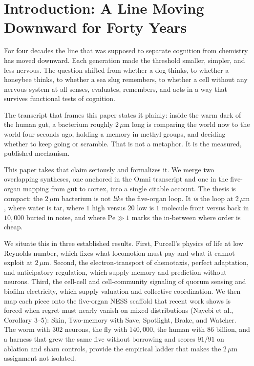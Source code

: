 \documentclass[12pt,a4paper]{article}
\newcommand{\Pe}{\mathrm{Pe}}
\begin{document}
\tableofcontents
\newpage

\section{Introduction: A Line Moving Downward for Forty Years}
\label{sec:intro}

For four decades the line that was supposed to separate cognition from chemistry has moved downward. Each generation made the threshold smaller, simpler, and less nervous. The question shifted from whether a dog thinks, to whether a honeybee thinks, to whether a sea slug remembers, to whether a cell without any nervous system at all senses, evaluates, remembers, and acts in a way that survives functional tests of cognition.

The transcript that frames this paper states it plainly: inside the warm dark of the human gut, a bacterium roughly $2\,\mu\mathrm{m}$ long is comparing the world now to the world four seconds ago, holding a memory in methyl groups, and deciding whether to keep going or scramble. That is not a metaphor. It is the measured, published mechanism.

This paper takes that claim seriously and formalizes it. We merge two overlapping syntheses, one anchored in the Omni transcript and one in the five-organ mapping from gut to cortex, into a single citable account. The thesis is compact: the $2\,\mu\mathrm{m}$ bacterium is not \emph{like} the five-organ loop. It \emph{is} the loop at $2\,\mu\mathrm{m}$, where water is tar, where $1$ high versus $20$ low is $1$ molecule front versus back in $10{,}000$ buried in noise, and where $\Pe \gg 1$ marks the in-between where order is cheap.

We situate this in three established results. First, Purcell's physics of life at low Reynolds number, which fixes what locomotion must pay and what it cannot exploit at $2\,\mu\mathrm{m}$. Second, the electron-transport of chemotaxis, perfect adaptation, and anticipatory regulation, which supply memory and prediction without neurons. Third, the cell-cell and cell-community signaling of quorum sensing and biofilm electricity, which supply valuation and collective coordination. We then map each piece onto the five-organ NESS scaffold that recent work shows is forced when regret must nearly vanish on mixed distributions (Nayebi et al., Corollary 3--5): Skin, Two-memory with Save, Spotlight, Brake, and Watcher. The worm with $302$ neurons, the fly with $140{,}000$, the human with $86$ billion, and a harness that grew the same five without borrowing and scores $91/91$ on ablation and sham controls, provide the empirical ladder that makes the $2\,\mu\mathrm{m}$ assignment not isolated.
\end{document}
